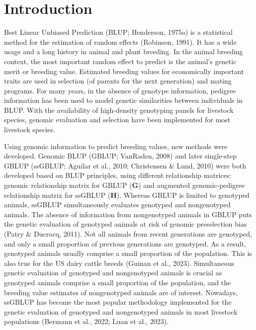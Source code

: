 \documentclass[authordate, empirical]{jote-new-article}
\author[1]{\mbox{Mohammad Ali Nilforooshan\orcid{0000-0003-0339-5442}}}
\affil[1]{Livestock Improvement Corporation, Hamilton, New Zealand}
\begin{document}
\begin{frontmatter}
  \maketitle
  \begin{abstract}
    \printabstracttext
  \end{abstract}
\end{frontmatter}

	\section{Introduction}



	Best Linear Unbiased Prediction (BLUP; Henderson, 1975a) is a statistical method for the estimation of random effects (Robinson, 1991). It has a wide usage and a long history in animal and plant breeding. In the animal breeding context, the most important random effect to predict is the animal's genetic merit or breeding value. Estimated breeding values for economically important traits are used in selection (of parents for the next generation) and mating programs. For many years, in the absence of genotype information, pedigree information has been used to model genetic similarities between individuals in BLUP. With the availability of high-density genotyping panels for livestock species, genomic evaluation and selection have been implemented for most livestock species.



	Using genomic information to predict breeding values, new methods were developed. Genomic BLUP (GBLUP; VanRaden, 2008) and later single-step GBLUP (ssGBLUP; Aguilar et al., 2010; Christensen \& Lund, 2010) were both developed based on BLUP principles, using different relationship matrices: genomic relationship matrix for GBLUP (\textbf{G}) and augmented genomic-pedigree relationship matrix for ssGBLUP (\textbf{H}). Whereas GBLUP is limited to genotyped animals, ssGBLUP simultaneously evaluates genotyped and nongenotyped animals. The absence of information from nongenotyped animals in GBLUP puts the genetic evaluation of genotyped animals at risk of genomic preselection bias (Patry \& Ducrocq, 2011). Not all animals from recent generations are genotyped, and only a small proportion of previous generations are genotyped. As a result, genotyped animals usually comprise a small proportion of the population. This is also true for the US dairy cattle breeds (Guinan et al., 2023). Simultaneous genetic evaluation of genotyped and nongenotyped animals is crucial as genotyped animals comprise a small proportion of the population, and the breeding value estimates of nongenotyped animals are of interest. Nowadays, ssGBLUP has become the most popular methodology implemented for the genetic evaluation of genotyped and nongenotyped animals in most livestock populations (Bermann et al., 2022; Luan et al., 2023).
\end{document}
